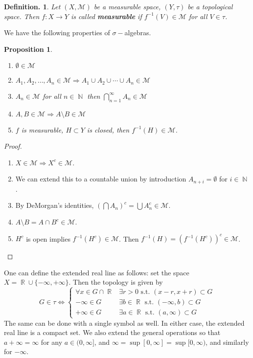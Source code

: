 \documentclass[12pt, a4paper]{memoir}
\DeclareMathOperator{\N}{{\mathbb{N}}}
\DeclareMathOperator{\R}{{\mathbb{R}}}
\newtheorem{proposition}[theorem]{Proposition}
\theoremstyle{nonumberplain}
\newtheorem{definition}{Definition.}
\newtheorem{proof}{Proof}
\begin{document}
\begin{definition}
    Let $(X,\mathcal{M})$ be a measurable space, $(Y,\tau)$ be a topological space.
    Then $f:X\to Y$ is called \textbf{measurable} if $f^{-1}(V)\in\mathcal{M}$ for all $V\in\tau$.
\end{definition}
We have the following properties of $\sigma-$algebras.
\begin{proposition}
    \begin{enumerate}[nolistsep]
        \item $\emptyset\in\mathcal{M}$
        \item $A_1,A_2,\ldots,A_n\in\mathcal{M}\Rightarrow A_1\cup A_2\cup\cdots \cup A_n\in\mathcal{M}$
        \item $A_n\in\mathcal{M}$ for all $n\in\N$ then $\bigcap_{n=1}^\infty A_n\in\mathcal{M}$
        \item $A,B\in\mathcal{M}\Rightarrow A\setminus B\in\mathcal{M}$
        \item $f$ is measurable, $H\subset Y$ is closed, then $f^{-1}(H)\in\mathcal{M}$.
    \end{enumerate}
\end{proposition}
\begin{proof}
    \begin{enumerate}[nolistsep]
        \item $X\in\mathcal{M}\Rightarrow X^c\in\mathcal{M}$.
        \item We can extend this to a countable union by introduction $A_{n+i}=\emptyset$ for $i\in\N$.
        \item By DeMorgan's identities, $(\bigcap A_n)^c=\bigcup A_n^c\in\mathcal{M}$.
        \item $A\setminus B=A\cap B^c\in\mathcal{M}$.
        \item $H^c$ is open implies $f^{-1}(H^c)\in\mathcal{M}$.
            Then $f^{-1}(H)=(f^{-1}(H^c))^c\in\mathcal{M}$.
    \end{enumerate}
\end{proof}
One can define the extended real line as follows: set the space $X=\R\cup\{-\infty,+\infty\}$.
Then the topology is given by
\[G\in\tau\Leftrightarrow
    \begin{cases}
        \forall x\in G\cap\R & \exists r>0 \text{ s.t. } (x-r,x+r)\subset G\\
        -\infty\in G & \exists b\in\R \text{ s.t. }(-\infty,b)\subset G\\
        +\infty\in G & \exists a\in\R \text{ s.t. }(a,\infty)\subset G
    \end{cases}
\]
The same can be done with a single symbol as well.
In either case, the extended real line is a compact set.
We also extend the general operations so that $a+\infty=\infty$ for any $a\in(0,\infty]$, and $\infty=\sup[0,\infty]=\sup[0,\infty)$, and similarly for $-\infty$.
\end{document}
